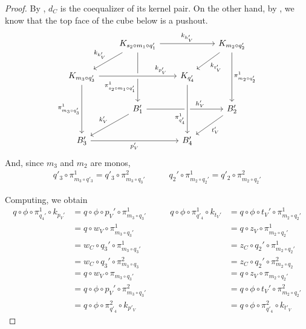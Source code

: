 \begin{proof}
	By , $d_C$ is the coequalizer of its kernel pair. On the other hand, by , we know that the top face of the cube below is a pushout.
	\[\begin{tikzcd}[row sep=20, column sep = 20]
	& {K_{s_2\circ m_1 \circ q_1'}} && {K_{m_2\circ q_2'}} \\
	{K_{m_3 \circ q_3'}} && {K_{q_4'}} \\
	& {B'_1} && {B'_2} \\
	{B'_3} && {B'_4}
	\arrow["{k_{h'_V}}", from=1-2, to=1-4]
	\arrow["{k_{k_V'}}"', from=1-2, to=2-1]
	\arrow["{\pi_{s_2\circ m_1 \circ q_1'}^1}"'{pos=0.7}, from=1-2, to=3-2]
	\arrow["{k_{t_V'}}", from=1-4, to=2-3]
	\arrow["{\pi_{m_2\circ q_2'}^1}", from=1-4, to=3-4]
	\arrow["{k_{p_V'}}"{pos=0.8}, from=2-1, to=2-3, crossing over]
	\arrow["{\pi_{m_3 \circ q_3'}^1}"', from=2-1, to=4-1]
	\arrow["{h_V'}"{pos=0.7}, from=3-2, to=3-4]
	\arrow["{\pi_{q_4'}^1}"'{pos=0.7}, from=2-3, to=4-3, crossing over]
	\arrow["{k_V'}"', from=3-2, to=4-1]
	\arrow["{t_V'}", from=3-4, to=4-3]
	\arrow["{p_V'}"', from=4-1, to=4-3]
	\end{tikzcd}\]
	And, since $m_3$ and $m_2$ are monos,
	\[\begin{split}
		q'_3 \circ \pi_{m_3 \circ q'_3}^1 = q'_3 \circ \pi_{m_3\circ q_3'}^2
	\end{split}\qquad\begin{split}
		q_2' \circ \pi_{m_2 \circ q_2'}^1 = q'_2 \circ \pi_{m_2 \circ q_2'}^2
	\end{split}\]
	
	Computing, we obtain
	\[\begin{split}
		q \circ \phi \circ \pi_{q_4'}^1 \circ k_{p_V'} &= q \circ \phi \circ p_V' \circ \pi_{m_3 \circ q_3'}^1 \\ &= q \circ w_V \circ \pi_{m_3 \circ q_3'}^1 \\ &= w_C \circ q_3' \circ \pi_{m_3 \circ q_3'}^1 \\ &= w_C \circ q_3' \circ \pi_{m_3 \circ q_3}^2 \\ &= q \circ w_V \circ \pi_{m_3 \circ q_3'} \\ &= q \circ \phi \circ p_V' \circ \pi_{m_3 \circ q_3'}^2 \\ &= q \circ \phi \circ \pi_{q'_4}^2 \circ k_{p'_V}
	\end{split}\qquad\begin{split}
		q \circ \phi \circ \pi_{q'_4}^1 \circ k_{t_V'} &= q \circ \phi \circ t_V' \circ \pi_{m_2 \circ q_2'}^1 \\ &= q \circ z_V \circ \pi_{m_2 \circ q_2'}^1 \\ &= z_C \circ q_2' \circ \pi_{m_2 \circ q_2'}^1 \\ &= z_C \circ q_2' \circ \pi_{m_2 \circ q_2}^2 \\ &= q \circ z_V \circ \pi_{m_2 \circ q_2'} \\ &= q \circ \phi \circ t_V' \circ \pi_{m_2 \circ q_2'}^2 \\ &= q \circ \phi \circ \pi_{q'_4}^2 \circ k_{t'_V}
	\end{split}\]


\end{proof}
